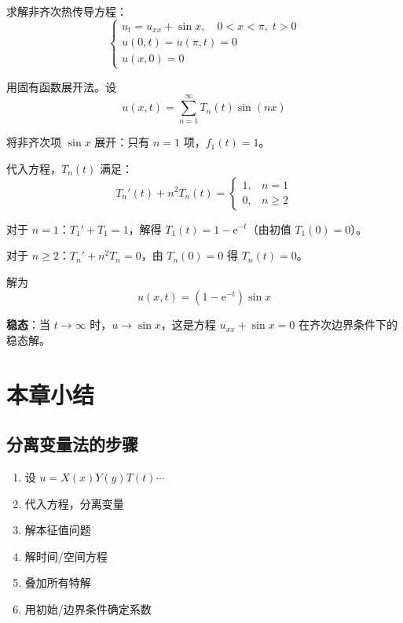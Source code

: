 \begin{lizi}{}{}
求解非齐次热传导方程：
\begin{equation}
    \begin{cases}
        u_t = u_{xx} + \sin x, \quad 0 < x < \pi, \; t > 0 \\
        u(0, t) = u(\pi, t) = 0 \\
        u(x, 0) = 0
    \end{cases}
\end{equation}

\begin{jie}
    用固有函数展开法。设
    \begin{equation}
        u(x, t) = \sum_{n=1}^{\infty} T_n(t)\sin(nx)
    \end{equation}

    将非齐次项 $\sin x$ 展开：只有 $n = 1$ 项，$f_1(t) = 1$。

    代入方程，$T_n(t)$ 满足：
    \begin{equation}
        T_n'(t) + n^2 T_n(t) = \begin{cases} 1, & n = 1 \\ 0, & n \geq 2 \end{cases}
    \end{equation}

    对于 $n = 1$：$T_1' + T_1 = 1$，解得 $T_1(t) = 1 - \mathrm{e}^{-t}$（由初值 $T_1(0) = 0$）。

    对于 $n \geq 2$：$T_n' + n^2 T_n = 0$，由 $T_n(0) = 0$ 得 $T_n(t) = 0$。

    解为
    \begin{equation}
        u(x, t) = (1 - \mathrm{e}^{-t})\sin x
    \end{equation}

    \textbf{稳态}：当 $t \to \infty$ 时，$u \to \sin x$，这是方程 $u_{xx} + \sin x = 0$ 在齐次边界条件下的稳态解。
\end{jie}
\end{lizi}

\section{本章小结}

\subsection{分离变量法的步骤}

\begin{enumerate}
    \item 设 $u = X(x)Y(y)T(t)\cdots$
    \item 代入方程，分离变量
    \item 解本征值问题
    \item 解时间/空间方程
    \item 叠加所有特解
    \item 用初始/边界条件确定系数
\end{enumerate}

